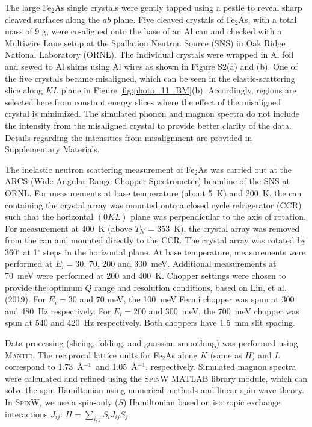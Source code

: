 \documentclass[10pt,doublespacing,edeposit]{uiucthesis2020}
\begin{document}
\begin{mainmatter}
The large Fe$_2$As single crystals were gently tapped using a pestle to reveal sharp cleaved surfaces along the $ab$ plane.
Five cleaved crystals of Fe$_2$As, with a total mass of 9 g, were co-aligned onto the base of an Al can and checked with a Multiwire Laue setup at the Spallation Neutron Source (SNS)\cite{mason2006spallation} in Oak Ridge National Laboratory (ORNL). The individual crystals were wrapped in Al foil and sewed to Al shims using Al wires as shown in Figure S2(a) and (b).\cite{supplement} 
One of the five crystals became misaligned, which can be seen in the elastic-scattering slice along $KL$ plane in Figure \ref{fig:photo_11_BM}(b).
Accordingly, regions are selected here from constant energy slices where the effect of the misaligned crystal is minimized. The simulated phonon and magnon spectra do not include the intensity from the misaligned crystal to provide better clarity of the data. Details regarding the intensities from misalignment are provided in Supplementary Materials.\cite{supplement}

The inelastic neutron scattering measurement of Fe$_2$As
was carried out at the ARCS (Wide Angular-Range Chopper Spectrometer) beamline\cite{ doi:10.1063/1.3680104} of the SNS at ORNL. For measurements at  base temperature (about 5~K) and 200~K, the can containing the crystal array was mounted onto a closed cycle refrigerator (CCR) such that the horizontal $(0KL)$ plane was perpendicular to the axis of rotation. For measurement at 400~K (above $T_N$ = 353~K), the crystal array was removed from the can and mounted directly to the CCR. The crystal array was rotated by 360$^{\circ}$ at 1$^{\circ}$ steps in the horizontal plane.
At base temperature, measurements were performed at $E_i = 30$, 70, 200 and 300~meV.  Additional measurements at 70~meV were performed at 200 and 400~K.
Chopper settings were chosen to provide the optimum $Q$ range and resolution conditions, based on Lin, et al. (2019).\cite{Lin2019} For $E_i = 30$ and  70 meV, the 100~meV Fermi chopper was spun at 300 and 480~Hz respectively.  For $E_i = 200$ and 300~meV, the 700~meV chopper was spun at 540 and 420~Hz respectively.  Both choppers have 1.5~mm slit spacing.


Data processing (slicing, folding, and gaussian smoothing) was performed using \textsc{Mantid}.\cite{Arnold2014} The reciprocal lattice units for Fe$_2$As along $K$ (same as $H$) and $L$ correspond to 1.73~\AA$^{-1}$~and 1.05~\AA$^{-1}$, respectively.
Simulated magnon spectra were calculated and refined using the \textsc{SpinW MATLAB} library module, which can solve the spin Hamiltonian using numerical methods and linear spin wave theory.\cite{Toth_2015} 
In \textsc{SpinW}, we use a spin-only ($S$)  Hamiltonian based on isotropic exchange interactions $J_{ij}$: $ H = \sum_{i,j} S_i J_{ij} S_j$.
    


\end{mainmatter}
\end{document}
